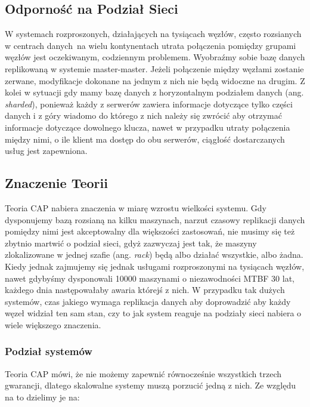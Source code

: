 \documentclass[a4paper,11pt]{article}
\begin{document}
\subsection*{Odporność na Podział Sieci}

W systemach rozproszonych, działających na tysiącach węzłów, często rozsianych
w centrach danych\ na wielu kontynentach
utrata połączenia pomiędzy grupami węzłów jest oczekiwanym, codziennym
problemem. Wyobraźmy sobie bazę danych replikowaną w systemie master-master.
Jeżeli połączenie między węzłami zostanie zerwane, modyfikacje dokonane na
jednym z nich nie będą widoczne na drugim. Z kolei w sytuacji gdy mamy bazę
danych z horyzontalnym podziałem danych (ang. \emph{sharded}), ponieważ każdy z
serwerów zawiera informacje dotyczące tylko części danych i z góry wiadomo do
którego z nich należy się zwrócić aby otrzymać informacje dotyczące dowolnego
klucza, nawet w przypadku utraty połączenia między nimi, o ile klient ma dostęp
do obu serwerów, ciągłość dostarczanych usług jest zapewniona.

\subsection*{Znaczenie Teorii}

Teoria CAP nabiera znaczenia w miarę wzrostu wielkości systemu. Gdy dysponujemy
bazą rozsianą na kilku maszynach, narzut czasowy replikacji danych pomiędzy nimi
jest akceptowalny dla większości zastosowań, nie musimy się też zbytnio martwić
o podział sieci, gdyż zazwyczaj jest tak, że maszyny zlokalizowane w jednej
szafie (ang. \emph{rack}) będą albo działać wszystkie, albo żadna. Kiedy jednak
zajmujemy się jednak usługami rozproszonymi na tysiącach węzłów, nawet gdybyśmy
dysponowali 10000 maszynami o niezawodności MTBF 30 lat, każdego dnia
następowałaby awaria którejś z nich\cite{google-lessons}. W przypadku tak dużych
systemów, czas jakiego wymaga replikacja danych aby doprowadzić aby każdy
węzeł widział ten sam stan, czy to jak system reaguje na podziały sieci nabiera
o wiele większego znaczenia.

\subsubsection*{Podział systemów}

Teoria CAP mówi, że nie możemy zapewnić równocześnie wszystkich trzech
gwarancji, dlatego skalowalne systemy muszą porzucić jedną z nich. Ze względu
na to dzielimy je na:
\end{document}
